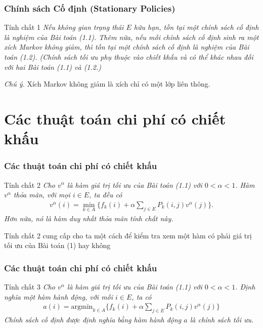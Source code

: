 \documentclass[12pt]{beamer}
\begin{document}
\begin{frame}
	\frametitle{Chính sách Cố định (Stationary Policies)}
   \begin{exampleblock}{Tính chất 1}
   	 \textit{Nếu không gian trạng thái $E$ hữu hạn, tồn tại một chính sách cố định là nghiệm của Bài toán (1.1). Thêm nữa, nếu mỗi chính sách cố định sinh ra một xích Markov không giảm, thì tồn tại một chính sách cố định là nghiệm của Bài toán (1.2). (Chính sách tối ưu phụ thuộc vào chiết khấu và có thể khác nhau đối với hai Bài toán (1.1) và (1.2.) }
	\end{exampleblock}
 \textit{Chú ý.} Xích Markov không giảm là xích chỉ có một lớp liên thông.
\end{frame}


\section{Các thuật toán chi phí có chiết khấu}
\begin{frame}
	\frametitle{Các thuật toán chi phí có chiết khấu}
	\begin{exampleblock}{Tính chất 2}
	 \textit{Cho $v^\alpha$ là hàm giá trị tối ưu của Bài toán (1.1) với $0<\alpha<1$. Hàm $v^\alpha$ thỏa mãn, với mọi $i \in E$, ta đều có
	\begin{align}
	v^\alpha (i)=\underset{k \in A} {\min }\{f_k(i)+\alpha \sum_{j \in E}P_k(i,j)v^\alpha(j)\} .
	\end{align} 
	Hơn nữa, nó là hàm duy nhất thỏa mãn tính chất này.}	
	\end{exampleblock}
     Tính chất 2 cung cấp cho ta một cách để kiểm tra xem một hàm có phải giá trị tối ưu của Bài toán (1) hay không
\end{frame}
\begin{frame}
	\frametitle{Các thuật toán chi phí có chiết khấu}
   \begin{exampleblock}{Tính chất 3}
   	 \textit {Cho $v^\alpha$ là hàm giá trị tối ưu của Bài toán (1.1) với $0<\alpha<1$. Định nghĩa một hàm hành động, với mỗi $i\in E$, ta có
   		\begin{align}
   		a(i)=\mathrm{argmin}_{k\in A}\{f_k(i)+\alpha \sum_{j \in E}P_k(i,j)v^\alpha(j)\}
   		\end{align}
   		Chính sách cố định được định nghĩa bằng hàm hành động $a$ là chính sách tối ưu.}	
   	\end{exampleblock}
\end{frame}
\end{document}
